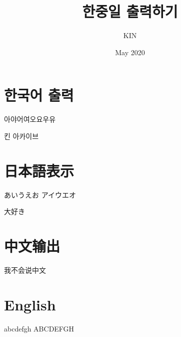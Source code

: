 \documentclass[a4paper]{bxjsarticle}
\title{한중일 출력하기}
\author{KIN}
\date{May 2020}
\begin{document}
\maketitle

\section{한국어 출력}
아야어여오요우유

킨 아카이브
\section{日本語表示}
あいうえお アイウエオ

大好き
\section{中文输出}
我不会说中文
\section{English}
abcdefgh ABCDEFGH
\end{document}
